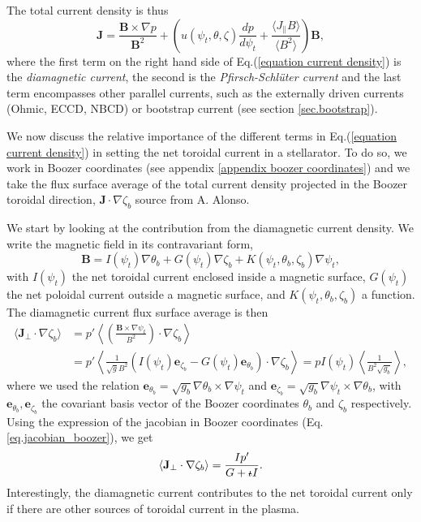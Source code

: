 \documentclass[my_thesis.tex]{subfiles}
\begin{document}
The total current density is thus
\begin{equation}
	\mathbf{J} = \frac{\mathbf{B}\times\nabla p}{\mathbf{B}^2} + \left(u(\psi_t,\theta,\zeta)\frac{dp}{d\psi_t} + \frac{\langle J_\parallel B\rangle}{\langle B^2\rangle}\right)\mathbf{B}, \label{equation current density}
\end{equation}
where the first term on the right hand side of Eq.(\ref{equation current density}) is the \emph{diamagnetic current}, the second is the \emph{Pfirsch-Schl\"uter current} and the last term encompasses other parallel currents, such as the externally driven currents (Ohmic, \ac{ECCD}, \ac{NBCD}) or bootstrap current (see section \ref{sec.bootstrap}).

We now discuss the relative importance of the different terms in Eq.(\ref{equation current density}) in setting the net toroidal current in a stellarator. To do so, we work in Boozer coordinates (see appendix \ref{appendix  boozer coordinates}) and we take the flux surface average of the total current density projected in the Boozer toroidal direction, $\mathbf{J}\cdot\nabla\zeta_b$ {\color{red} source from A. Alonso}.

We start by looking at the contribution from the diamagnetic current density. We write the magnetic field in its contravariant form,
\begin{equation}
	\mathbf{B} = I(\psi_t)\nabla\theta_b + G(\psi_t)\nabla\zeta_b + K(\psi_t,\theta_b,\zeta_b)\nabla\psi_t, 
\end{equation}
with $I(\psi_t)$ the net toroidal current enclosed inside a magnetic surface, $G(\psi_t)$ the net poloidal current outside a magnetic surface, and $K(\psi_t,\theta_b,\zeta_b)$ a function. The diamagnetic current flux surface average is then
\begin{align}
	\langle\mathbf{J}_\perp\cdot\nabla\zeta_b\rangle &= p'\left\langle \left(\frac{\mathbf{B}\times\nabla\psi_t}{B^2}\right)\cdot\nabla\zeta_b\right\rangle\\
	&= p'\left\langle \frac{1}{\sqrt{g}B^2}(I(\psi_t) \mathbf{e}_{\zeta_b} - G(\psi_t)\mathbf{e}_{\theta_b})\cdot\nabla\zeta_b\right\rangle = pI(\psi_t)\left\langle \frac{1}{B^2 \sqrt{g_b}} \right\rangle,
\end{align} 
where we used the relation $\mathbf{e}_{\theta_b} = \sqrt{g_b}\nabla\theta_b\times\nabla\psi_t$ and $\mathbf{e}_{\zeta_b} = \sqrt{g_b}\nabla\psi_t\times\nabla\theta_b$, with $\mathbf{e}_{\theta_b},\mathbf{e}_{\zeta_b}$ the covariant basis vector of the Boozer coordinates $\theta_b$ and $\zeta_b$ respectively. Using the expression of the jacobian in Boozer coordinates (Eq.\ref{eq.jacobian_boozer}), we get
\begin{equation}
	\langle\mathbf{J}_\perp\cdot\nabla\zeta_b\rangle = \frac{Ip'}{G+\text{$\iota\!\!$-} I}.
\end{equation}
Interestingly, the diamagnetic current contributes to the net toroidal current only if there are other sources of toroidal current in the plasma.
\end{document}
